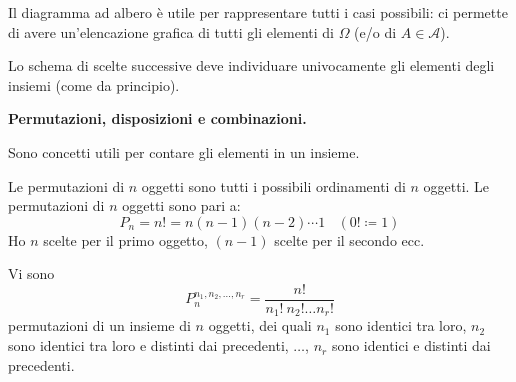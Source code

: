 
\begin{oss}
	Il diagramma ad albero è utile per rappresentare tutti i casi possibili: ci permette di avere un'elencazione grafica di tutti gli elementi di $\Omega $ (e/o di $A\in \mathcal{A}$).
\end{oss}

\begin{oss}
	Lo schema di scelte successive deve individuare univocamente gli elementi degli insiemi (come da principio).
\end{oss}

\textbf{Permutazioni, disposizioni e combinazioni.}

Sono concetti utili per contare gli elementi in un insieme.

\begin{definition}
	Le permutazioni di $n$ oggetti sono tutti i possibili ordinamenti di $n$ oggetti. Le permutazioni di $n$ oggetti sono pari a:
	\begin{equation*}
		\boxed{P_{n} =n!=n( n-1)( n-2) \cdots 1} \ \ \ \ ( 0!\coloneqq 1)
	\end{equation*}
	Ho $n$ scelte per il primo oggetto, $( n-1)$ scelte per il secondo ecc.
\end{definition}

\begin{oss}
	Vi sono
	\begin{equation*}
		\boxed{P_{n}^{n_{1} ,n_{2} ,\dots ,n_{r}} =\frac{n!}{n_{1} !\ n_{2} !\dots n_{r} !}}
	\end{equation*}
	permutazioni di un insieme di $n$ oggetti, dei quali $n_{1}$ sono identici tra loro, $n_{2}$ sono identici tra loro e distinti dai precedenti, $\dots $, $n_{r}$ sono identici e distinti dai precedenti.
\end{oss}

